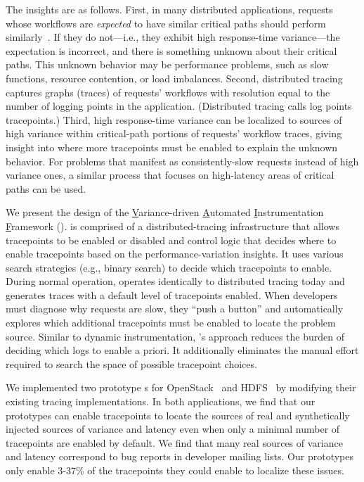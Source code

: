 The insights are as follows.  First, in many distributed applications,
requests whose workflows are \textit{expected} to have similar
critical paths should perform similarly~\cite{Sambasivan:2012wv}.  If
they do not---i.e., they exhibit high response-time variance---the
expectation is incorrect, and there is something unknown about their
critical paths.  This unknown behavior may be performance problems,
such as slow functions, resource contention, or load imbalances.
Second, distributed tracing captures graphs (traces) of requests'
workflows with resolution equal to the number of logging points in the
application. (Distributed tracing calls log points tracepoints.)
Third, high response-time variance can be localized to sources of high
variance within critical-path portions of requests' workflow traces,
giving insight into where more tracepoints must be enabled to explain
the unknown behavior.  For problems that manifest as consistently-slow
requests instead of high variance ones, a similar process that focuses
on high-latency areas of critical paths can be used.

We present the design of the \underline{V}ariance-driven
\underline{A}utomated \underline{I}nstrumentation
\underline{F}ramework (\STAIF{}).  \STAIF{} is comprised of a
distributed-tracing infrastructure that allows tracepoints to be
enabled or disabled and control logic that decides where to enable
tracepoints based on the performance-variation insights.  It uses
various search strategies (e.g., binary search) to decide which
tracepoints to enable.  During normal operation, \STAIF{} operates
identically to distributed tracing today and generates traces with a
default level of tracepoints enabled.  When developers must diagnose
why requests are slow, they ``push a button'' and \STAIF{}
automatically explores which additional tracepoints must be enabled to
locate the problem source.  Similar to dynamic instrumentation,
\STAIF{}'s approach reduces the burden of deciding which logs to
enable a priori.  It additionally eliminates the manual effort
required to search the space of possible tracepoint choices.

We implemented two prototype \STAIF{}s for OpenStack~\cite{Openstack}
and HDFS~\cite{HDFS} by modifying their existing tracing
implementations.  In both applications, we find that our prototypes
can enable tracepoints to locate the sources of real and synthetically
injected sources of variance and latency even when only a minimal
number of tracepoints are enabled by default.  We find that many real
sources of variance and latency correspond to bug reports in developer
mailing lists.  Our prototypes only enable 3-37\% of the tracepoints
they could enable to localize these issues.

